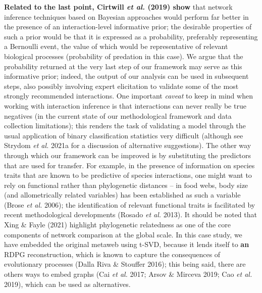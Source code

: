 \documentclass[11pt]{article}
\makeatletter
\def\maxwidth{\ifdim\Gin@nat@width>\linewidth\linewidth
\else\Gin@nat@width\fi}
\let\Oldincludegraphics\includegraphics
\renewcommand{\includegraphics}[1]{\Oldincludegraphics[width=\maxwidth]{#1}}
\providecommand{\DIFaddtex}[1]{{\bf #1}} %
\providecommand{\DIFdeltex}[1]{} %
\providecommand{\DIFaddbegin}{\protect\color{blue}} %
\providecommand{\DIFaddend}{\protect\color{black}} %
\providecommand{\DIFdelbegin}{\protect\color{red}} %
\providecommand{\DIFdelend}{\protect\color{black}} %
\providecommand{\DIFadd}[1]{\texorpdfstring{\DIFaddtex{#1}}{#1}} %
\providecommand{\DIFdel}[1]{\texorpdfstring{\DIFdeltex{#1}}{}} %
\newcommand{\DIFscaledelfig}{0.5}
\newlength{\DIFdelgraphicswidth} %
\newlength{\DIFdelgraphicsheight} %
\newcommand{\DIFaddincludegraphics}[2][]{{\color{blue}\fbox{\DIFOincludegraphics[#1]{#2}}}} %
\newcommand{\DIFdelincludegraphics}[2][]{%
\sbox{\DIFdelgraphicsbox}{\DIFOincludegraphics[#1]{#2}}%
\settoboxwidth{\DIFdelgraphicswidth}{\DIFdelgraphicsbox} %
\settoboxtotalheight{\DIFdelgraphicsheight}{\DIFdelgraphicsbox} %
\scalebox{\DIFscaledelfig}{%
\parbox[b]{\DIFdelgraphicswidth}{\usebox{\DIFdelgraphicsbox}\\[-\baselineskip] \rule{\DIFdelgraphicswidth}{0em}}\llap{\resizebox{\DIFdelgraphicswidth}{\DIFdelgraphicsheight}{%
\setlength{\unitlength}{\DIFdelgraphicswidth}%
\begin{picture}(1,1)%
\thicklines\linethickness{2pt} %
{\color[rgb]{1,0,0}\put(0,0){\framebox(1,1){}}}%
{\color[rgb]{1,0,0}\put(0,0){\line( 1,1){1}}}%
{\color[rgb]{1,0,0}\put(0,1){\line(1,-1){1}}}%
\end{picture}%
}\hspace*{3pt}}} %
} %
\DeclareRobustCommand{\DIFaddbegin}{\DIFOaddbegin \let\includegraphics\DIFaddincludegraphics} %
\DeclareRobustCommand{\DIFaddend}{\DIFOaddend \let\includegraphics\DIFOincludegraphics} %
\DeclareRobustCommand{\DIFdelbegin}{\DIFOdelbegin \let\includegraphics\DIFdelincludegraphics} %
\DeclareRobustCommand{\DIFdelend}{\DIFOaddend \let\includegraphics\DIFOincludegraphics} %
\makeatother
\begin{document}
\DIFadd{Related to the last point, Cirtwill \emph{et al.} (2019) show }\DIFaddend that
network inference techniques based on Bayesian approaches would perform
far better in the presence of an interaction-level informative prior;
the desirable properties of such a prior would be that it is expressed
as a probability, preferably representing a Bernoulli event, the value
of which would be representative of relevant biological processes
(probability of predation in this case). We argue that the probability
returned at the very last step of our framework may serve as this
informative prior; indeed, the output of our analysis can be used in
subsequent steps, also possibly involving expert elicitation to validate
some of the most strongly recommended interactions. One important
\emph{caveat} to keep in mind when working with interaction inference is
that interactions can never really be true negatives (in the current
state of our methodological framework and data collection limitations);
this renders the task of validating a model through the usual
application of binary classification statistics very difficult (although
see Strydom \emph{et al.} 2021a for a discussion of alternative
suggestions). The other way through which our framework can be improved
is by substituting the predictors that are used for transfer. For
example, in the presence of information on species traits that are known
to be predictive of species interactions, one might want to rely on
functional rather than phylogenetic distances -- in food webs, body size
(and allometrically related variables) has been established as such a
variable (Brose \emph{et al.} 2006); the identification of relevant
functional traits is facilitated by recent methodological developments
(Rosado \emph{et al.} 2013). It should be noted that Xing \& Fayle
(2021) highlight phylogenetic relatedness as one of the core components
of network comparison at the global scale. In this case study, we have
embedded the original metaweb using t-SVD, because it lends itself to \DIFdelbegin \DIFdel{a
}\DIFdelend \DIFaddbegin \DIFadd{an
}\DIFaddend RDPG reconstruction, which is known to capture the consequences of
evolutionary processes (Dalla Riva \& Stouffer 2016); this being said,
there are others ways to embed graphs (Cai \emph{et al.} 2017; Arsov \&
Mirceva 2019; Cao \emph{et al.} 2019), which can be used as
alternatives.
\end{document}
